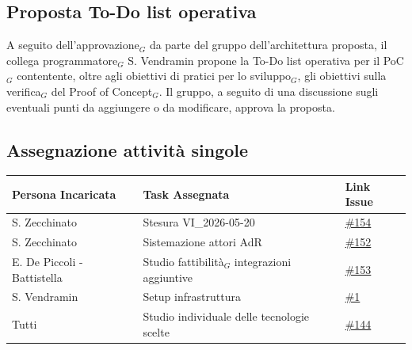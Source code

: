 \documentclass[a4paper, 10pt, colorlinks=true, linkcolor=black, urlcolor=blue, citecolor=blue, hidelinks]{article}
\newcommand{\issueDoc}[1]{\href{https://github.com/thebitless-group-swe/thebitless.github.io/issues/#1}{\##1}}
\newcommand{\issuePoC}[1]{\href{https://github.com/thebitless-group-swe/PoC/issues/#1}{\##1}}
\begin{document}
\subsection{Proposta To-Do list operativa}
A seguito dell'approvazione$_G$ da parte del gruppo dell'architettura proposta, il collega programmatore$_G$ S. Vendramin propone la To-Do list operativa per il PoC$_G$ contentente, oltre agli obiettivi di pratici per lo sviluppo$_G$, gli obiettivi sulla verifica$_G$ del Proof of Concept$_G$.
Il gruppo, a seguito di una discussione sugli eventuali punti da aggiungere o da modificare, approva la proposta.

\subsection{Assegnazione attività singole}
\begin{center}
    \renewcommand{\arraystretch}{1.4}
        \begin{tabular}{|p{4.2cm}|p{6.2cm}|p{2.2cm}|}
        \hline
        \textbf{Persona Incaricata} & \textbf{Task Assegnata} & \centering\textbf{Link Issue} \tabularnewline
        \hline
        S. Zecchinato & Stesura VI\_2026-05-20 & \issueDoc{154} \\
        \hline
        S. Zecchinato & Sistemazione attori AdR & \issueDoc{152} \\
        \hline
        E. De Piccoli - Battistella & Studio fattibilità$_G$ integrazioni aggiuntive & \issueDoc{153} \\
        \hline
        S. Vendramin & Setup infrastruttura & \issuePoC{1} \\
        \hline
        Tutti & Studio individuale delle tecnologie scelte & \issueDoc{144} \\
        \hline
    \end{tabular}
\end{center}

\appendix
\end{document}
